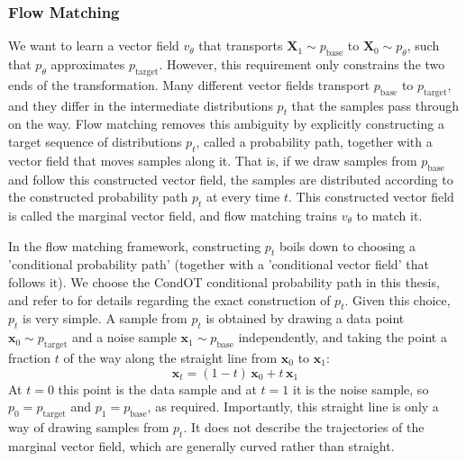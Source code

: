 \documentclass[12pt,a4paper]{report}
\begin{document}
\subsubsection{Flow Matching}
\label{subsubsec:flow_matching}
We want to learn a vector field $v_{\theta}$ that transports $\mathbf{X}_1\sim p_{\mathrm{base}}$ to $\mathbf{X}_0\sim p_{\theta}$, such that $p_{\theta}$ approximates $p_{\mathrm{target}}$. However, this requirement only constrains the two ends of the transformation. Many different vector fields transport $p_{\mathrm{base}}$ to $p_{\mathrm{target}}$, and they differ in the intermediate distributions $p_t$ that the samples pass through on the way. Flow matching \parencite{lipman_FM} removes this ambiguity by explicitly constructing a target sequence of distributions $p_t$, called a probability path, together with a vector field that moves samples along it. That is, if we draw samples from $p_{\mathrm{base}}$ and follow this constructed vector field, the samples are distributed according to the constructed probability path $p_t$ at every time $t$. This constructed vector field is called the marginal vector field, and flow matching trains $v_{\theta}$ to match it.

In the flow matching framework, constructing $p_t$ boils down to choosing a 'conditional probability path' (together with a 'conditional vector field' that follows it).
We choose the CondOT conditional probability path in this thesis, and refer to \textcite{mit_FM} for details regarding the exact construction of $p_t$. Given this choice, $p_t$ is very simple. A sample from $p_t$ is obtained by drawing a data point $\mathbf{x}_0\sim p_{\mathrm{target}}$ and a noise sample $\mathbf{x}_1\sim p_{\mathrm{base}}$ independently, and taking the point a fraction $t$ of the way along the straight line from $\mathbf{x}_0$ to $\mathbf{x}_1$:
\begin{equation}
\mathbf{x}_t
=
(1-t)\,\mathbf{x}_0+t\,\mathbf{x}_1
\label{eq:condot_interpolation}
\end{equation}
At $t=0$ this point is the data sample and at $t=1$ it is the noise sample, so $p_0=p_{\mathrm{target}}$ and $p_1=p_{\mathrm{base}}$, as required. Importantly, this straight line is only a way of drawing samples from $p_t$. It does not describe the trajectories of the marginal vector field, which are generally curved rather than straight.
\end{document}
